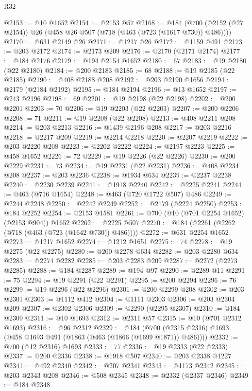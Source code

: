 \begin{lexlean}{R32}
\begin{coremodule}
@2153 := @10 @1652
@2154 := @2153 @57
@2168 := @184 (@700 (@2152 (@27 @2154)) @26 (@458 @26 @507 (@718 (@463 (@723 (@1617 @730)) @486))))
@2170 := @631 @2149 @26
@2171 := @1217 @26
@2172 := @1159 @491
@2173 := @203 @2172
@2174 := @2173 @209
@2176 := @2170 (@2171 @2174)
@2177 := @184 @2176
@2179 := @194 @2154 @1652
@2180 := 67
@2183 := @19 @2180 (@22 @2180)
@2184 := @200 @2183
@2185 := 68
@2188 := @19 @2185 (@22 @2185)
@2190 := @408 @2188 @208
@2192 := @203 @2190 @1656
@2194 := @2179 (@2184 @2192)
@2195 := @184 @2194
@2196 := @13 @1652
@2197 := @243 @2196
@2198 := 69
@2201 := @19 @2198 (@22 @2198)
@2202 := @200 @2201
@2203 := 70
@2206 := @19 @2203 (@22 @2203)
@2207 := @200 @2206
@2208 := 71
@2211 := @19 @2208 (@22 @2208)
@2213 := @408 @2211 @208
@2214 := @203 @2213
@2216 := @1439 @2196 @208
@2217 := @203 @2216
@2218 := @2217 @209
@2219 := @2214 @2218
@2220 := @2207 @2219
@2222 := @203 @2220 @208
@2223 := @2202 @2222
@2224 := @2197 @2223
@2225 := @458 @1652
@2226 := 72
@2229 := @19 @2226 (@22 @2226)
@2230 := @200 @2229
@2231 := 73
@2234 := @19 @2231 (@22 @2231)
@2236 := @408 @2234 @208
@2237 := @203 @2236
@2238 := @1934 @634
@2239 := @2237 @2238
@2240 := @2230 @2239
@2241 := @1918 @2240
@2242 := @2225 @2241
@2244 := @463 (@716 @1654)
@2248 := @463 (@720 @1722 @507) @486
@2249 := @2244 @2248
@2250 := @2242 @2249
@2252 := @2179 (@2224 @2250)
@2253 := @184 @2252
@2254 := @2153 @1581
@2261 := @700 (@10 (@701 @2254 @1652) (@2153 @904)) @1652
@2262 := @2225 @507
@2270 := @184 (@2261 (@2262 (@718 (@463 (@723 (@1642 @730)) @486))))
@2272 := @631 @2254 @1652
@2273 := @1217 @1652
@2274 := @1212 @1651
@2275 := 74
@2278 := @19 @2275 (@22 @2275)
@2280 := @200 @2278 @634
@2282 := @203 @2280 @634
@2283 := @2274 @2282
@2285 := @203 @2283 @209
@2287 := @2272 (@2273 @2285)
@2288 := @184 @2287
@2289 := @194 @97
@2290 := @2289 @11
@2291 := 75
@2294 := @19 @2291 (@22 @2291)
@2295 := @200 @2294
@2296 := 76
@2299 := @19 @2296 (@22 @2296)
@2301 := @200 @2299 @208
@2302 := @203 @2301
@2303 := @1112 @412
@2304 := @1111 @2303
@2306 := @203 @2304 @209
@2307 := @2302 @2306
@2309 := @2290 (@2295 @2307)
@2310 := @184 @2309
@2311 := @10 @1693
@2312 := @2311 @57
@2315 := @10 (@701 @2312 @1693)
@2316 := @96 @2312
@2329 := @184 (@700 (@2315 @2316) @1693 (@458 @1693 @491 (@1863 (@463 (@1866 (@1699 @1871)) @486))))
@2332 := @700 (@12 @2316) @1693
@2333 := 77
@2336 := @19 @2333 (@22 @2333)
@2337 := @200 @2336
@2338 := @1918 @507
@2340 := @203 @2338 @1227
@2341 := @492 @2340
@2342 := @207 @2341
@2343 := @1173 @2342
@2345 := @203 @2343 @208
@2346 := @508 @2345
@2348 := @2332 (@2337 @2346)
@2349 := @184 @2348

\end{coremodule}
\end{lexlean}
